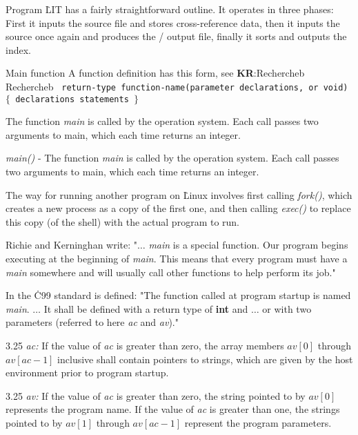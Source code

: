 Program \hfill \break
\.{LIT} has a fairly straightforward outline.  It operates in
three phases: First it inputs the source file and stores cross-reference
data, then it inputs the source once again and produces the \TEX/ output
file, finally it sorts and outputs the index.

\vskip 2pt
\fi

 Main function \hfill \break
A function definition has this form, see {\bf KR}:Rechercheb
Rechercheb
\vskip 2pt \noindent
{\tt
return-type function-name(parameter declarations, or void) \hfill \break
$\lbrace$ \hfill \break
\indent declarations \hfill \break
\indent statements \hfill \break
$\rbrace$
}

\vskip 4pt \noindent
The function {\sl main} is called by the operation system. Each call passes two
arguments to main, which each time returns an integer.

\vskip 2pt \noindent
{\sl main()} - The function {\sl main} is called by the operation system. Each
call passes two
arguments to main, which each time returns an integer.

\vskip 2pt \noindent
The way for running another program on \.{Linux} involves first
calling {\sl fork()}, which creates a new process as a copy of the first one,
and then calling {\sl exec()} to replace this copy (of the shell) with the
actual program to run.

\vskip 2pt \noindent
Richie and Kerninghan write: "$\ldots$ {\sl main} is a special function. Our
program
begins executing at the beginning of {\sl main}. This means that every program
must have a {\sl main} somewhere and will usually call other functions to help
perform its
job."

\vskip 2pt \noindent
In the \.{C99} standard is defined: "The function called at program startup is
named {\sl main}. $\ldots$ It shall be defined with a return type of {\bf int}
and
$\ldots$ or with two parameters (referred to here {\sl ac} and {\sl av})."

\vskip 2pt
 3.25 {\sl ac:} { \rm If the value of {\sl ac} is greater than zero, the
array members $av[0]$ through $av[ac-1]$ inclusive shall contain pointers to
strings, which are given by the host environment prior to program startup. }

 3.25 {\sl av:} { \rm If the value of {\sl ac} is greater than zero, the
string pointed to by $av[0]$ represents the program name. If the value of
{\sl ac} is greater than one, the strings pointed to by $av[1]$ through
$av[ac-1]$ represent the program parameters. }

